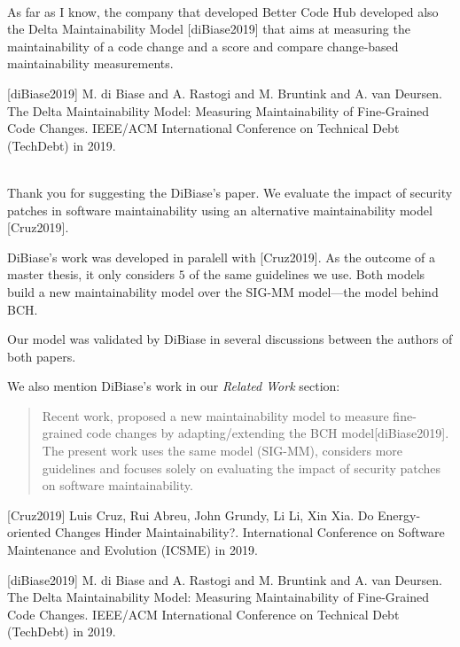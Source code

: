\documentclass[11pt,fleqn]{article}
\newcommand{\eline}{\vspace*{.75\baselineskip}}
\newcommand{\Referee}[1]{\eline \noindent {\bf Reviewer comment #1:} \\}
\newcommand{\Us}{\eline \noindent {\bf Response:}\\}
\newenvironment{revcomment}[1][]
{\Referee{#1}\begin{rcomment}}
{\end{rcomment}}
\begin{document}

\begin{revcomment}[1.2]

    As far as I know, the company that developed Better Code Hub 
    developed also the Delta Maintainability Model [diBiase2019] 
    that aims at measuring the maintainability of a code change 
    and a score and compare change-based maintainability measurements.

    [diBiase2019] M. di Biase and A. Rastogi and M. Bruntink and A. van 
    Deursen. The Delta Maintainability Model: Measuring Maintainability 
    of Fine-Grained Code Changes. IEEE/ACM International Conference 
    on Technical Debt (TechDebt) in 2019.

\end{revcomment}

\Us Thank you for suggesting the DiBiase's paper. 
We evaluate the impact of security patches in software 
maintainability using an alternative maintainability model [Cruz2019]. 

DiBiase's work was developed in paralell with [Cruz2019]. As
the outcome of a master thesis, it only considers $5$ of the same 
guidelines we use. Both models build a new maintainability model
over the SIG-MM model---the model behind BCH. 

Our model was validated by DiBiase in several discussions between 
the authors of both papers.

We also mention DiBiase's work in our \textit{Related Work} section:
\begin{quote}
    Recent work,
proposed a new maintainability model to 
measure fine-grained code changes by adapting/extending the BCH model[diBiase2019].
The present work uses the same model (SIG-MM), considers more guidelines and focuses 
solely on evaluating the impact of security patches on software maintainability.
\end{quote}

[Cruz2019] Luis Cruz, Rui Abreu, John Grundy, Li Li, Xin Xia. 
Do Energy-oriented Changes Hinder Maintainability?. International 
Conference on Software Maintenance and Evolution (ICSME) in 2019.

[diBiase2019] M. di Biase and A. Rastogi and M. Bruntink and A. van 
Deursen. The Delta Maintainability Model: Measuring Maintainability 
of Fine-Grained Code Changes. IEEE/ACM International Conference 
on Technical Debt (TechDebt) in 2019.
\end{document}
